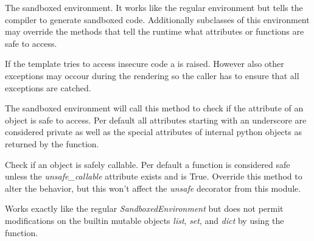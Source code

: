 \documentclass[a4paper,10pt,english]{sphinxmanual}
\begin{document}
\begin{fulllineitems}
\label{sandbox:jinja2.sandbox.SandboxedEnvironment}
The sandboxed environment.  It works like the regular environment but
tells the compiler to generate sandboxed code.  Additionally subclasses of
this environment may override the methods that tell the runtime what
attributes or functions are safe to access.

If the template tries to access insecure code a {\hyperref[sandbox:jinja2.sandbox.SecurityError]{}} is
raised.  However also other exceptions may occour during the rendering so
the caller has to ensure that all exceptions are catched.

\begin{fulllineitems}
\label{sandbox:jinja2.sandbox.SandboxedEnvironment.is_safe_attribute}
The sandboxed environment will call this method to check if the
attribute of an object is safe to access.  Per default all attributes
starting with an underscore are considered private as well as the
special attributes of internal python objects as returned by the
{\hyperref[sandbox:jinja2.sandbox.is_internal_attribute]{}} function.

\end{fulllineitems}


\begin{fulllineitems}
\label{sandbox:jinja2.sandbox.SandboxedEnvironment.is_safe_callable}
Check if an object is safely callable.  Per default a function is
considered safe unless the \emph{unsafe\_callable} attribute exists and is
True.  Override this method to alter the behavior, but this won't
affect the \emph{unsafe} decorator from this module.

\end{fulllineitems}


\end{fulllineitems}


\begin{fulllineitems}
\label{sandbox:jinja2.sandbox.ImmutableSandboxedEnvironment}
Works exactly like the regular \emph{SandboxedEnvironment} but does not
permit modifications on the builtin mutable objects \emph{list}, \emph{set}, and
\emph{dict} by using the {\hyperref[sandbox:jinja2.sandbox.modifies_known_mutable]{}} function.

\end{fulllineitems}
\end{document}

